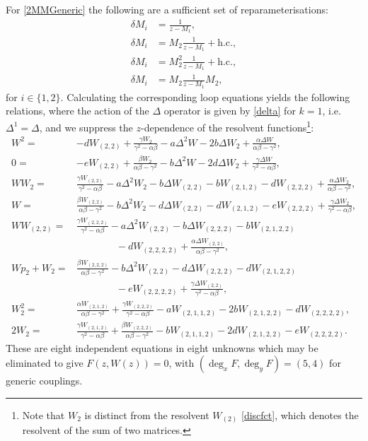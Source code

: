 For \eqref{2MMGeneric} the following are a sufficient set of reparameterisations:
%
\begin{align}
    \label{2MMGenericReps}
    \delta M_{i} & = \frac{1}{z-M_1}, \\
    \delta M_{i} & = M_2 \frac{1}{z-M_1} + \text{h.c.}, \\
    \delta M_{i} & = M_2^2 \frac{1}{z-M_1}+\text{h.c.}, \\
    \delta M_{i} & = M_2 \frac{1}{z-M_1} M_2,
\end{align}
%
for $i\in\{1,2\}$. Calculating the corresponding loop equations yields the following relations,
where the action of the $\Delta$ operator is given by \eqref{delta} for $k=1$, i.e.
$\Delta^1=\Delta$, and we suppress the $z$-dependence of the resolvent functions\footnote{Note that
    $W_2$ is distinct from the resolvent $W_{(2)}$ \eqref{discfct}, which denotes the resolvent of the
    sum of two matrices.}:
%
\begin{align}
    W^2 =             & -d W_{(2,2)}+\frac{\gamma  W_{2}}{\gamma ^2-\alpha  \beta }-a\Delta^2 W -2b \Delta W_{2} +\frac{\alpha \Delta W}{\alpha  \beta -\gamma ^2}, \\
    0 =               & -e W _{(2,2)}+\frac{\beta  W_{2}}{\alpha  \beta -\gamma ^2} - b\Delta^2 W  - 2d\Delta W_{2}+\frac{\gamma \Delta W}{\gamma ^2-\alpha  \beta }, \\
    W  W_{2} =        & \frac{\gamma  W_{(2,2)}}{\gamma ^2-\alpha  \beta }-a\Delta^2 W_{2} -b \Delta W_{(2,2)} -b W_{(2,1,2)}-d W_{(2,2,2)}+\frac{\alpha  \Delta W_{2}}{\alpha  \beta -\gamma ^2}, \\
    W =               & \frac{\beta  W_{(2,2)}}{\alpha  \beta -\gamma ^2}-b \Delta^2 W_{2}-d\Delta W_{(2,2)}-d W_{(2,1,2)}-e W_{(2,2,2)}+\frac{\gamma \Delta W_{2}}{\gamma ^2-\alpha  \beta }, \\
    W  W_{(2,2)} =    & \frac{\gamma  W_{(2,2,2)}}{\gamma ^2-\alpha  \beta }-a\Delta^2 W_{(2,2)}-b\Delta W_{(2,2,2)}-b W_{(2,1,2,2)} \\
                      & \qquad \qquad -d W_{(2,2,2,2)}+\frac{\alpha  \Delta W_{(2,2)}}{\alpha  \beta -\gamma ^2}, \nonumber \\
    W  p_{2}+ W_{2} = & \frac{\beta  W_{(2,2,2)}}{\alpha  \beta -\gamma ^2}-b\Delta^2 W_{(2,2)}-d\Delta W_{(2,2,2)}-d W_{(2,1,2,2)} \\
                      & \qquad \qquad -e W_{(2,2,2,2)}+\frac{\gamma \Delta W_{(2,2)}}{\gamma ^2-\alpha  \beta }, \nonumber \\
    W_{2}^2 =         & \frac{\alpha  W_{(2,1,2)}}{\alpha  \beta -\gamma ^2}+\frac{\gamma  W_{(2,2,2)}}{\gamma ^2-\alpha  \beta }-a W_{(2,1,1,2)}-2 b W_{(2,1,2,2)}-d W _{(2,2,2,2)}, \\
    2 W_{2} =         & \frac{\gamma  W_{(2,1,2)}}{\gamma ^2-\alpha  \beta }+\frac{\beta  W_{(2,2,2)}}{\alpha  \beta -\gamma ^2}-b W_{(2,1,1,2)}-2 d W_{(2,1,2,2)}-e W_{(2,2,2,2)}.
\end{align}
%
These are eight independent equations in eight unknowns which may be eliminated to give
$F(z,W(z))=0$, with $(\deg_x F,\deg_y F)=(5,4)$ for generic couplings.

